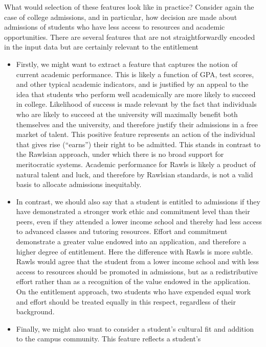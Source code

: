 What would selection of these features look like in practice? Consider again the
case of college admissions, and in particular, how decision are made about
admissions of students who have less access to resources and academic
opportunities. There are several features that are not straightforwardly encoded
in the input data but are certainly relevant to the entitlement
\begin{itemize}
    \item Firstly, we might want to extract a feature that captures the notion
    of current academic performance. This is likely a function of GPA, test
    scores, and other typical academic indicators, and is justified by an appeal
    to the idea that students who perform well academically are more likely to
    succeed in college. Likelihood of success is made relevant by the fact
    that individuals who are likely to succeed at the university will maximally
    benefit both themselves and the university, and therefore justify their
    admissions in a free market of talent. This positive feature represents an
    action of the individual that gives rise (``earns'') their right to be
    admitted. This stands in contrast to the Rawlsian approach, under which
    there is no broad support for meritocratic systems. Academic performance for
    Rawls is likely a product of natural talent and luck, and therefore by
    Rawlsian standards, is not a valid basis to allocate admissions inequitably.
    \item In contrast, we should also say that a student is entitled to
    admissions if they have demonstrated a stronger work ethic and commitment
    level than their peers, even if they attended a lower income school and
    thereby had less access to advanced classes and tutoring resources. Effort
    and commitment demonstrate a greater value endowed into an application, and
    therefore a higher degree of entitlement. Here the difference with Rawls is
    more subtle. Rawls would agree that the student from a lower income school
    and with less access to resources should be promoted in admissions, but as a
    redistributive effort rather than as a recognition of the value endowed in
    the application. On the entitlement approach, two students who have expended
    equal work and effort should be treated equally in this respect, regardless
    of their background.
    \item Finally, we might also want to consider a student's cultural fit and
    addition to the campus community. This feature reflects a student's

\end{itemize}
